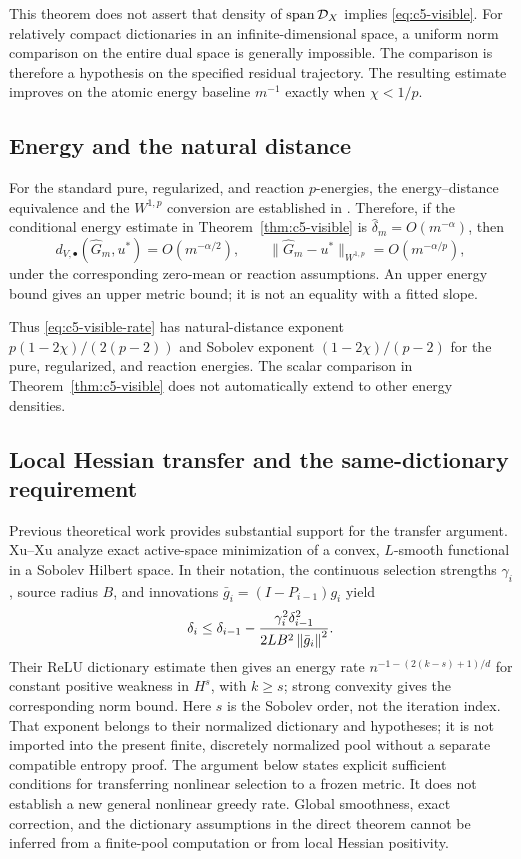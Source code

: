 \documentclass[11pt]{article}
\theoremstyle{remark}
\begin{document}
This theorem does not assert that density of $\operatorname{span}\mathcal D_X$
implies \eqref{eq:c5-visible}. For relatively compact dictionaries in an
infinite-dimensional space, a uniform norm comparison on the entire dual
space is generally impossible. The comparison is therefore a hypothesis on
the specified residual trajectory. The resulting estimate improves on the
atomic energy baseline $m^{-1}$ exactly when $\chi<1/p$.

\subsection{Energy and the natural distance}
\label{sec:c5-natural}

For the standard pure, regularized, and reaction $p$-energies, the energy--distance
equivalence and the $W^{1,p}$ conversion are established in
\CGAEnergyMetricReference. Therefore, if the
conditional energy estimate in Theorem~\ref{thm:c5-visible} is
$\widehat\delta_m=O(m^{-\alpha})$, then
\[
 d_{V,\bullet}(\widehat G_m,u^*)=O(m^{-\alpha/2}),\qquad
 \|\widehat G_m-u^*\|_{W^{1,p}}=O(m^{-\alpha/p}),
\]
under the corresponding zero-mean or reaction assumptions. An upper energy bound
gives an upper metric bound; it is not an equality with a fitted slope.

Thus \eqref{eq:c5-visible-rate} has natural-distance exponent
$p(1-2\chi)/(2(p-2))$ and Sobolev exponent $(1-2\chi)/(p-2)$ for the
pure, regularized, and reaction energies. The scalar comparison in Theorem~\ref{thm:c5-visible}
does not automatically extend to other energy densities.

\subsection{Local Hessian transfer and the same-dictionary requirement}
\label{sec:c5-hessian}

Previous theoretical work provides substantial support for the transfer argument.
Xu--Xu \cite[Theorem~3.1, equations~(17)--(19)]{XuXu2025}
analyze exact active-space minimization of a convex, $L$-smooth
functional in a Sobolev Hilbert space. In their notation, the continuous
selection strengths $\gamma_i$, source radius $B$, and innovations
$\bar g_i=(I-P_{i-1})g_i$ yield
\[
 \delta_i\leq\delta_{i-1}
 -\frac{\gamma_i^2\delta_{i-1}^2}{2LB^2\left\lVert\bar g_i\right\rVert^2}.
\]
Their ReLU dictionary estimate then gives an energy rate
$n^{-1-(2(k-s)+1)/d}$ for constant positive weakness in $H^s$,
with $k\geq s$; strong convexity gives the corresponding norm bound.
Here $s$ is the Sobolev order, not the iteration index.
That exponent belongs to their normalized dictionary and hypotheses; it is
not imported into the present finite, discretely normalized pool without a
separate compatible entropy proof.
The argument below states explicit sufficient conditions for
transferring nonlinear selection to a frozen metric. It does not establish
a new general nonlinear greedy rate. Global smoothness, exact correction,
and the dictionary assumptions in the direct theorem cannot be inferred
from a finite-pool computation or from local Hessian positivity.
\end{document}
